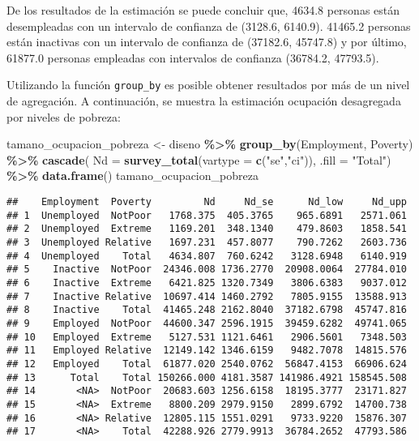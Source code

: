 \documentclass[
  12pt,
]{book}
\newenvironment{Shaded}{\begin{snugshade}}{\end{snugshade}}
\newcommand{\AttributeTok}[1]{\textcolor[rgb]{0.13,0.29,0.53}{#1}}
\newcommand{\FunctionTok}[1]{\textcolor[rgb]{0.13,0.29,0.53}{\textbf{#1}}}
\newcommand{\NormalTok}[1]{#1}
\newcommand{\OtherTok}[1]{\textcolor[rgb]{0.56,0.35,0.01}{#1}}
\newcommand{\SpecialCharTok}[1]{\textcolor[rgb]{0.81,0.36,0.00}{\textbf{#1}}}
\newcommand{\StringTok}[1]{\textcolor[rgb]{0.31,0.60,0.02}{#1}}
\begin{document}
De los resultados de la estimación se puede concluir que, 4634.8 personas están desempleadas con un intervalo de confianza de (3128.6, 6140.9). 41465.2 personas están inactivas con un intervalo de confianza de (37182.6, 45747.8) y por último, 61877.0 personas empleadas con intervalos de confianza (36784.2, 47793.5).

Utilizando la función \texttt{group\_by} es posible obtener resultados por más de un nivel de agregación. A continuación, se muestra la estimación ocupación desagregada por niveles de pobreza:

\begin{Shaded}
\begin{Highlighting}[]
\NormalTok{tamano\_ocupacion\_pobreza }\OtherTok{\textless{}{-}}\NormalTok{ diseno }\SpecialCharTok{\%\textgreater{}\%} 
                            \FunctionTok{group\_by}\NormalTok{(Employment, Poverty) }\SpecialCharTok{\%\textgreater{}\%} 
                            \FunctionTok{cascade}\NormalTok{( }\AttributeTok{Nd =} \FunctionTok{survey\_total}\NormalTok{(}\AttributeTok{vartype =}                                     \FunctionTok{c}\NormalTok{(}\StringTok{"se"}\NormalTok{,}\StringTok{"ci"}\NormalTok{)), }\AttributeTok{.fill =} \StringTok{"Total"}\NormalTok{) }\SpecialCharTok{\%\textgreater{}\%}
                            \FunctionTok{data.frame}\NormalTok{()}
\NormalTok{tamano\_ocupacion\_pobreza}
\end{Highlighting}
\end{Shaded}

\begin{verbatim}
##    Employment  Poverty         Nd     Nd_se      Nd_low     Nd_upp
## 1  Unemployed  NotPoor   1768.375  405.3765    965.6891   2571.061
## 2  Unemployed  Extreme   1169.201  348.1340    479.8603   1858.541
## 3  Unemployed Relative   1697.231  457.8077    790.7262   2603.736
## 4  Unemployed    Total   4634.807  760.6242   3128.6948   6140.919
## 5    Inactive  NotPoor  24346.008 1736.2770  20908.0064  27784.010
## 6    Inactive  Extreme   6421.825 1320.7349   3806.6383   9037.012
## 7    Inactive Relative  10697.414 1460.2792   7805.9155  13588.913
## 8    Inactive    Total  41465.248 2162.8040  37182.6798  45747.816
## 9    Employed  NotPoor  44600.347 2596.1915  39459.6282  49741.065
## 10   Employed  Extreme   5127.531 1121.6461   2906.5601   7348.503
## 11   Employed Relative  12149.142 1346.6159   9482.7078  14815.576
## 12   Employed    Total  61877.020 2540.0762  56847.4153  66906.624
## 13      Total    Total 150266.000 4181.3587 141986.4921 158545.508
## 14       <NA>  NotPoor  20683.603 1256.6158  18195.3777  23171.827
## 15       <NA>  Extreme   8800.209 2979.9150   2899.6792  14700.738
## 16       <NA> Relative  12805.115 1551.0291   9733.9220  15876.307
## 17       <NA>    Total  42288.926 2779.9913  36784.2652  47793.586
\end{verbatim}
\end{document}
